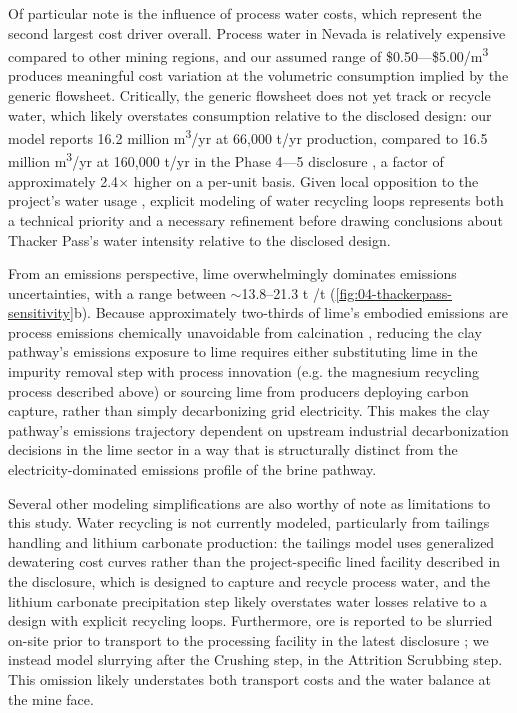 Of particular note is the influence of process water costs, which represent the second largest cost driver overall. Process water in Nevada is relatively expensive compared to other mining regions, and our assumed range of \$0.50---\$5.00/\si{m^3} produces meaningful cost variation at the volumetric consumption implied by the generic flowsheet. Critically, the generic flowsheet does not yet track or recycle water, which likely overstates consumption relative to the disclosed design: our model reports 16.2 million \si{m^3/yr} at 66,000 \si{t/yr} production, compared to 16.5 million \si{m^3/yr} at 160,000 \si{t/yr} in the Phase 4---5 disclosure \cite{sgscanadaincSK1300Technical2024}, a factor of approximately 2.4$\times$ higher on a per-unit basis. Given local opposition to the project's water usage \cite{alonzoenvironmentQuestionsWaterRights2025}, explicit modeling of water recycling loops represents both a technical priority and a necessary refinement before drawing conclusions about Thacker Pass's water intensity relative to the disclosed design.

From an emissions perspective, lime overwhelmingly dominates emissions uncertainties, with a range between $\sim$13.8–21.3 t /t  (\ref{fig:04-thackerpass-sensitivity}b). Because approximately two-thirds of lime's embodied emissions are process emissions chemically unavoidable from calcination \cite{lavegliaDecarbonizingLimebasedConstruction2023}, reducing the clay pathway's emissions exposure to lime requires either substituting lime in the impurity removal step with process innovation (e.g. the magnesium recycling process described above) or sourcing lime from producers deploying carbon capture, rather than simply decarbonizing grid electricity. This makes the clay pathway's emissions trajectory dependent on upstream industrial decarbonization decisions in the lime sector in a way that is structurally distinct from the electricity-dominated emissions profile of the brine pathway.

Several other modeling simplifications are also worthy of note as limitations to this study. Water recycling is not currently modeled, particularly from tailings handling and lithium carbonate production: the tailings model uses generalized dewatering cost curves rather than the project-specific lined facility described in the disclosure, which is designed to capture and recycle process water, and the lithium carbonate precipitation step likely overstates water losses relative to a design with explicit recycling loops. Furthermore, ore is reported to be slurried on-site prior to transport to the processing facility in the latest disclosure \cite{sgscanadaincSK1300Technical2024}; we instead model slurrying after the Crushing step, in the Attrition Scrubbing step. This omission likely understates both transport costs and the water balance at the mine face. 

